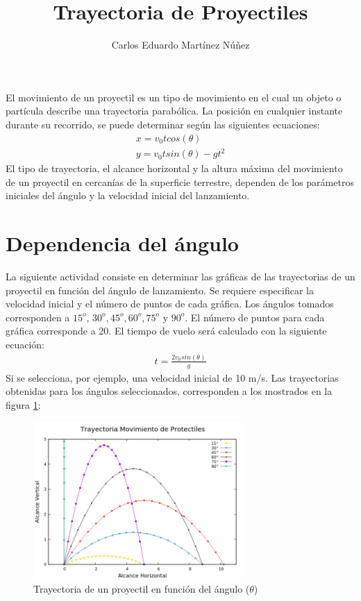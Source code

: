 \documentclass[12pt,a4paper,twoside]{article}
\author{Carlos Eduardo Martínez Núñez}
\title{\textbf{Trayectoria de Proyectiles}}
\begin{document}
\maketitle
El movimiento de un proyectil es un tipo de movimiento en el cual un objeto o partícula describe una trayectoria parabólica. La posición en cualquier instante durante su recorrido, se puede determinar según las siguientes ecuaciones:
\begin{eqnarray}
x=v_{0}tcos(\theta)\nonumber\\
y=v_{0}tsin(\theta)-gt^{2}
\end{eqnarray}
El tipo de trayectoria, el alcance horizontal y la altura máxima del movimiento de un proyectil en cercanías de la superficie terrestre, dependen de los parámetros iniciales del ángulo y la velocidad inicial del lanzamiento.
\section{Dependencia del ángulo}
La siguiente actividad consiste en determinar las gráficas de las trayectorias de un proyectil en función del ángulo de lanzamiento. Se requiere especificar la velocidad inicial y el número de puntos de cada gráfica. Los ángulos tomados corresponden a $15^{o}$, $30^{o}, 45^{o}, 60^{o}, 75^{o}$ y $90^{o}$. El número de puntos para cada gráfica  corresponde a 20. El tiempo de vuelo será calculado con  la siguiente ecuación:
\begin{eqnarray}
t=\frac{2v_{0}sin(\theta)}{g}
\end{eqnarray}
Si se selecciona, por ejemplo, una velocidad inicial de 10 m/s. Las trayectorias obtenidas para los ángulos seleccionados, corresponden a los mostrados en la figura \ref{fig:figura1}:
\begin{figure}[htbp]
\centering
\includegraphics[width=8cm]{Trayectoriaproyectiles.png} 
\caption{Trayectoria de un proyectil en función del ángulo ($\theta$)}\label{fig:figura1}
\end{figure}
\end{document}
